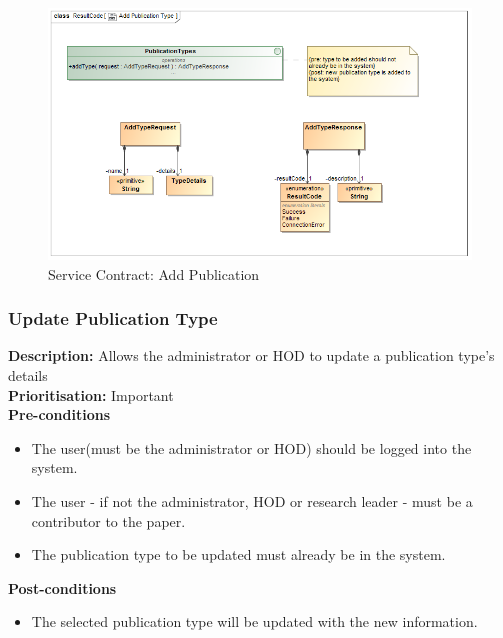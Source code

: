 \documentclass[a4paper]{article}
\begin{document}
        
        \begin{figure}[H]
        	\centering
        	\includegraphics[width=\textwidth]{5.1.8.Add.Publication.Type.Services.Contract.png}
        	\caption{Service Contract: Add Publication}
        \end{figure}
    
    \pagebreak
    \subsubsection{Update Publication Type}
    
    \textbf{Description:} Allows the administrator or HOD to update a publication type's details\\
    \textbf{Prioritisation:} Important\\
    
    
    \textbf{Pre-conditions}
     \begin{itemize}
        \item The user(must be the administrator or HOD) should be logged into the system.
        \item The user - if not the administrator, HOD or research leader - must be a contributor to the paper.
        \item The publication type to be updated must already be in the system.
   \end{itemize}
    
    \textbf{Post-conditions}
    \begin{itemize}
        \item The selected publication type will be updated with the new information.
    \end{itemize}
    
\end{document}
